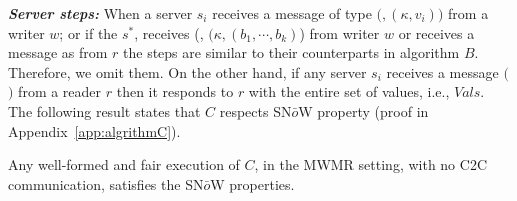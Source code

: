 \textit{\textbf{Server steps:}}  
When a server $s_i$ receives a message of type $(${\writeValueTag}$, ({\kappa}, v_{i}))$ from a writer $w$; or if 
the $s^*$, receives  (\updateCoordTag, $({\kappa}, (b_{1}, \cdots, b_{k})$) from writer $w$ or 
 receives  a message as  {\getTagArrayTag} from $r$ the steps are similar to their counterparts in algorithm $B$. 
 Therefore, we omit them.
On the other hand, if any server $s_i$ receives a message  $(${\readValuesTag}$)$ from a reader $r$ then it responds to $r$ with 
   the entire set of values, i.e., $Vals$. 
The following result states that $C$ respects SN$\bar{o}$W  property (proof in Appendix~\ref{app:algrithmC}).

\begin{theorem} Any well-formed  and fair execution of  $C$, in the MWMR setting, 
	with no C2C communication,  satisfies the SN$\bar{o}$W  properties. %
\end{theorem}

